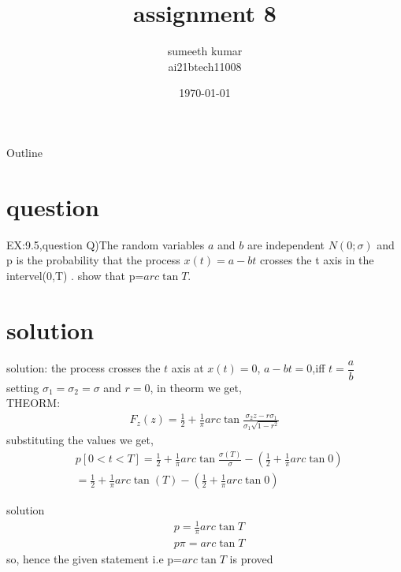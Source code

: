 \documentclass{beamer}
\title{assignment 8}
\author{sumeeth kumar\\ai21btech11008}
\date{\today}
\begin{document}
\begin{frame}
    \titlepage 
\end{frame}
\logo{}
\begin{frame}{Outline}
    \tableofcontents
\end{frame}
\section{question}
\begin{frame}{EX:9.5,question}
Q)The random variables $ a $ and $b$ are independent $N(0;\sigma)$ and p is the probability that the process $x(t)=a-bt $ crosses the t axis in the intervel(0,T)
. show that \pi p=$ arc\tan T$.
\end{frame}
\section{solution}
\begin{frame}{solution:}
   the process crosses the $t$ axis at $x(t)=0$, $a-bt=0$,iff $t=\dfrac{a}{b}$\\
   setting $\sigma_1=\sigma_2=\sigma$ and $r=0$, in theorm we get,\\[8pt]
   \bold THEORM:
   \begin{align}
       F_z(z)=\frac{1}{2}+\frac{1}{\pi}arc\tan\frac{\sigma_2z- r\sigma_1}{\sigma_1\sqrt{1-r^2}}
   \end{align}
   substituting the values we get,\\
   \begin{align}
  &{p[0<t<T]=\frac{1}{2}+\frac{1}{\pi}arc\tan\frac{\sigma (T)}{\sigma}-\left(
  \frac{1}{2}+\frac{1}{\pi}arc\tan0\right)}\\[8pt]
  &{=\frac{1}{2}+\frac{1}{\pi}arc\tan(T)-\left(
  \frac{1}{2}+\frac{1}{\pi}arc\tan0\right)}
  \end{align}
    \end{frame} 
    
    
    \begin{frame}{solution}
            \begin{align}
                &{p=\frac{1}{\pi}arc\tan T}\\[8pt]
                  &{p\pi=arc\tan T}
            \end{align}
             so, hence the  given statement i.e \pi p=$ arc\tan T$ is proved 
        \end{frame}
        
        
\end{document}
